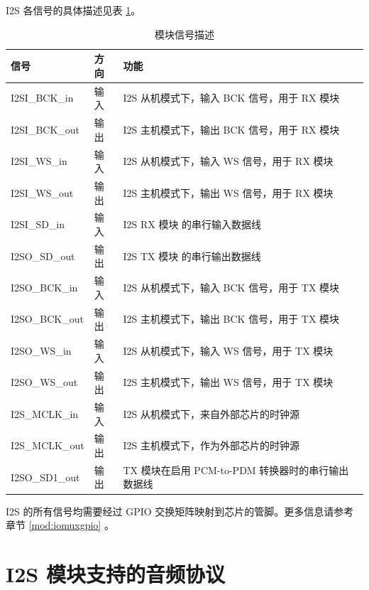 \documentclass[main\_\_CN.tex]{subfiles}
\begin{document}
I2S 各信号的具体描述见表 \ref{tab:i2s-signal-descr}。

\begin{table}[H]
    \centering
    \caption{模块信号描述}
    \label{tab:i2s-signal-descr}
    \begin{threeparttable}
    \begin{tabular}{|p{3cm}|p{1.5cm}|p{8cm}| }
    \hline
    \rowcolor{lightgray}
    \textbf{信号}&\textbf{方向}&\textbf{功能}\\
    \hline
    I2SI\_BCK\_in & 输入 & I2S 从机模式下，输入 BCK 信号，用于 RX 模块\\
    \hline
    I2SI\_BCK\_out& 输出 & I2S 主机模式下，输出 BCK 信号，用于 RX 模块\\
    \hline
    I2SI\_WS\_in & 输入 & I2S 从机模式下，输入 WS 信号，用于 RX 模块\\
    \hline
    I2SI\_WS\_out& 输出 & I2S 主机模式下，输出 WS 信号，用于 RX 模块\\\hline
    I2SI\_SD\_in& 输入 & I2S RX 模块 的串行输入数据线\\\hline
    I2SO\_SD\_out& 输出 & I2S TX 模块 的串行输出数据线\\\hline
    I2SO\_BCK\_in& 输入 & I2S 从机模式下，输入 BCK 信号，用于 TX 模块 \\\hline
    I2SO\_BCK\_out& 输出 & I2S 主机模式下，输出 BCK 信号，用于 TX 模块 \\\hline
    I2SO\_WS\_in& 输入 & I2S 从机模式下，输入 WS 信号，用于 TX 模块\\\hline
    I2SO\_WS\_out& 输出 & I2S 主机模式下，输出 WS 信号，用于 TX 模块\\\hline
    I2S\_MCLK\_in& 输入 & I2S 从机模式下，来自外部芯片的时钟源\\\hline
    I2S\_MCLK\_out& 输出 & I2S 主机模式下，作为外部芯片的时钟源\\\hline
    I2SO\_SD1\_out& 输出 & TX 模块在启用 PCM-to-PDM 转换器时的串行输出数据线\\\hline
    \end{tabular}
    \begin{tablenotes}
            \item[*] I2S 的所有信号均需要经过 GPIO 交换矩阵映射到芯片的管脚。更多信息请参考章节 \ref{mod:iomuxgpio} \textit{}。
    \end{tablenotes}
    \end{threeparttable}
\end{table}


\section{I2S 模块支持的音频协议} \label{sec:i2s-supported-audio-standards}
\end{document}
